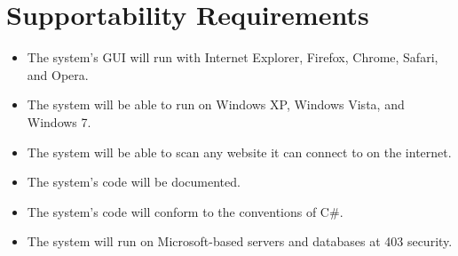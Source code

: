 \section{Supportability Requirements}
\begin{itemize}
\item The system's GUI will run with Internet Explorer, Firefox, Chrome, Safari, and Opera.
\item The system will be able to run on Windows XP, Windows Vista, and Windows 7.
\item The system will be able to scan any website it can connect to on the internet.
\item The system's code will be documented.
\item The system's code will conform to the conventions of C\#.
\item The system will run on Microsoft-based servers and databases at 403 security.
\end{itemize}
